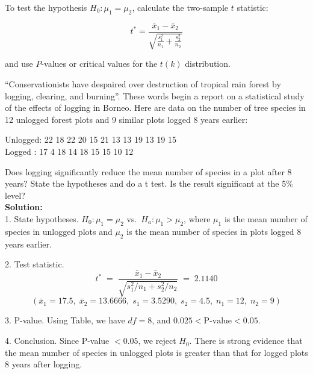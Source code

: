 To test the hypothesis $H_0 : \mu_1 = \mu_2$, calculate the two-sample $t$ statistic:

\[
t^* = \frac{\bar{x}_1 - \bar{x}_2}{\sqrt{\frac{s_1^2}{n_1} + \frac{s_2^2}{n_2}}}
\]

and use $P$-values or critical values for the $t(k)$ distribution.
\begin{example}
“Conservationists have despaired over destruction of tropical rain forest by logging, clearing, and burning”. These words begin a report on a statistical study of the effects of logging in Borneo. Here are data on the number of tree species in 12 unlogged forest plots and 9 similar plots logged 8 years earlier:

Unlogged: 22 18 22 20 15 21 13 13 19 13 19 15  \\
Logged : 17 4 18 14 18 15 15 10 12  

Does logging significantly reduce the mean number of species in a plot after 8 years? State the hypotheses and do a t test. Is the result significant at the 5\% level?\\
\vspace{0.5em}
\noindent\textbf{Solution:} \\
1. State hypotheses. $H_0: \mu_1 = \mu_2$ vs.\ $H_a: \mu_1 > \mu_2$, where $\mu_1$ is the mean number of species in unlogged plots and $\mu_2$ is the mean number of species in plots logged 8 years earlier.

2. Test statistic. 
\[
t^* \;=\;\frac{\bar x_1 - \bar x_2}{\sqrt{s_1^2/n_1 + s_2^2/n_2}}
\;=\;2.1140
\]
\[
(\bar x_1 = 17.5,\;\bar x_2 = 13.6666,\;s_1 = 3.5290,\;s_2 = 4.5,\;n_1 = 12,\;n_2 = 9)
\]

3. P-value. Using Table, we have $df = 8$, and $0.025 < \text{P-value} < 0.05$.

4. Conclusion. Since P-value $< 0.05$, we reject $H_0$. There is strong evidence that the mean number of species in unlogged plots is greater than that for logged plots 8 years after logging.
\end{example}
